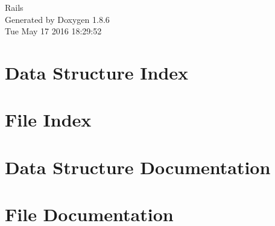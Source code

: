 \documentclass[twoside]{book}
\newcommand{\clearemptydoublepage}{%
  \newpage{\pagestyle{empty}\cleardoublepage}%
}
\begin{document}
\hypersetup{pageanchor=false}
\begin{titlepage}
\vspace*{7cm}
\begin{center}%
{\Large Rails }\\
\vspace*{1cm}
{\large Generated by Doxygen 1.8.6}\\
\vspace*{0.5cm}
{\small Tue May 17 2016 18:29:52}\\
\end{center}
\end{titlepage}
\clearemptydoublepage
\tableofcontents
\clearemptydoublepage
{}
\hypersetup{pageanchor=true}

\chapter{Data Structure Index}

\chapter{File Index}

\chapter{Data Structure Documentation}









\chapter{File Documentation}






























\newpage
{}
{}
\printindex
\end{document}
